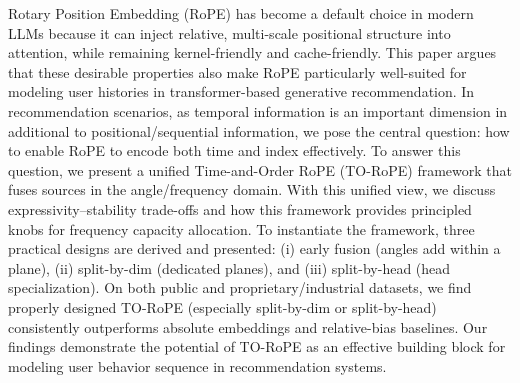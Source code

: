 \documentclass[sigconf]{acmart}
\begin{document}
Rotary Position Embedding (RoPE) has become a default choice in modern LLMs because it can inject relative, multi-scale positional structure into attention, while remaining kernel-friendly and cache-friendly. This paper argues that these desirable properties also make RoPE particularly well-suited for modeling user histories in transformer-based generative recommendation. In recommendation scenarios, as temporal information is an important dimension in additional to positional/sequential information, we pose the central question: how to enable RoPE to encode both time and index effectively. To answer this question, we present a unified Time-and-Order RoPE (TO-RoPE) framework that fuses sources in the angle/frequency domain. With this unified view, we discuss expressivity–stability trade-offs and how this framework provides principled knobs for frequency capacity allocation. To instantiate the framework, three practical designs are derived and presented: (i) early fusion (angles add within a plane), (ii) split-by-dim (dedicated planes), and (iii) split-by-head (head specialization).  On both public and proprietary/industrial datasets, we find properly designed TO-RoPE (especially split-by-dim or split-by-head) consistently outperforms absolute embeddings and relative-bias baselines. Our findings demonstrate the potential of TO-RoPE as an effective building block for modeling user behavior sequence in recommendation systems.



\clearpage 



\end{document}
